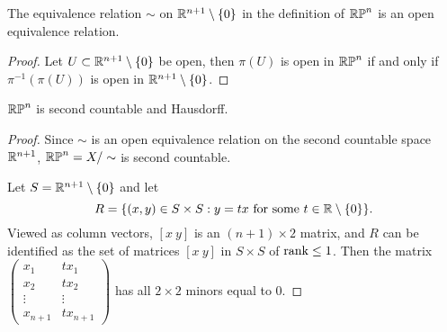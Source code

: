 \begin{proposition}
    The equivalence relation $\sim$ on $\mathbb{R}^{n+1}\setminus \{0\}$ in the definition of $\mathbb{RP}^n$ is an open equivalence relation. 
\end{proposition}
\begin{proof}
    Let $U \subset \mathbb{R}^{n+1}\setminus \{0\}$ be open, then $\pi(U)$ is open in $\mathbb{RP}^n$ if and only if $\pi^{-1}(\pi(U))$ is open in $\mathbb{R}^{n+1} \setminus \{0\}$. 
\end{proof}

 \begin{proposition}
     $\mathbb{RP}^n$ is second countable and Hausdorff.
 \end{proposition}
 \begin{proof}
     Since $\sim$ is an open equivalence relation on the second countable space $\mathbb{R}^{n+1}$, $\mathbb{RP}^n = X / \sim$ is second countable. 

     Let $S = \mathbb{R}^{n+1} \setminus \{0\}$ and let 
     $$R = \{(x,y) \in S \times S: y=tx \text{ for some }t \in \mathbb{R} \setminus \{0\} \}. $$
     Viewed as column vectors, $[x~y]$ is an $(n+1) \times 2$ matrix, and $R$ can be identified as the set of matrices $[x~y]$ in $S \times S$ of $\rank \leq 1$. Then the matrix 
     $\begin{pmatrix}
     x_1 & tx_1 \\
     x_2 & tx_2 \\
     \vdots & \vdots \\
     x_{n+1} & tx_{n+1} \end{pmatrix}$
     has all $2 \times 2$ minors equal to $0$.
     
 \end{proof}